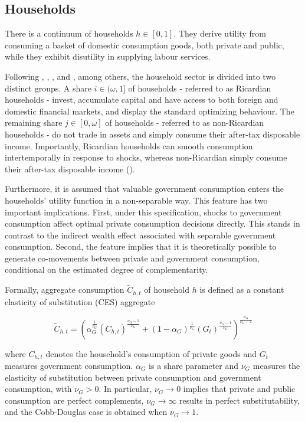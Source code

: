 \documentclass[a4paper,11pt]{article}
\numberwithin{equation}{section}
\begin{document}
	\subsection{Households}
	
	There is a continuum of households $h\in [ 0, 1 ]$. They derive utility from consuming a basket of domestic consumption goods, both private and public, while they exhibit disutility in supplying labour services.
	
	Following \cite{coenen2005}, \cite{gali}, \cite{jooste}, and \cite{coenen2013}, among others, the household sector is divided into two distinct groups. A share $i\in(\omega,1]$ of households - referred to as Ricardian households - invest, accumulate capital and have access to both foreign and domestic financial markets, and display the standard optimizing behaviour. The remaining share $j\in[0,\omega]$ of households - referred to as non-Ricardian households - do not trade in assets and simply consume their after-tax disposable income. Importantly, Ricardian households can smooth consumption intertemporally in response to shocks, whereas non-Ricardian simply consume their after-tax disposable income (\citealp{coenen2013}).
	
	Furthermore, it is assumed that valuable government consumption enters the households' utility function in a non-separable way. This feature has two important implications. First, under this specification, shocks to government consumption affect optimal private consumption decisions directly. This stands in contrast to the indirect wealth effect associated with separable government consumption. Second, the feature implies that it is theoretically possible to generate co-movements between private and government consumption, conditional on the estimated degree of complementarity.
	
	Formally, aggregate consumption $\tilde{C}_{h,t}$ of household $h$ is defined as a constant elasticity of substitution (CES) aggregate
	
	\begin{equation} \label{cons}
	\tilde{C}_{h,t}=\left(\alpha_G^{\frac{1}{\nu_G}}\left(C_{h,t}\right)^{\frac{\nu_G-1}{\nu_G}}+\left(1-\alpha_G\right)^{\frac{1}{\nu_G}}\left(G_t\right)^{\frac{\nu_G-1}{\nu_G}}\right)^{\frac{\nu_G}{\nu_G-1}}
	\end{equation} 
	
	where $C_{h,t}$ denotes the household's consumption of private goods and $G_t$ measures government consumption. $\alpha_G$ is a share parameter and $\nu_G$ measures the elasticity of substitution between private consumption and government consumption, with $\nu_G>0$. In particular, $\nu_G\rightarrow0$ implies that private and public consumption are perfect complements, $\nu_G\rightarrow\infty$ results in perfect substitutability, and the Cobb-Douglas case is obtained when $\nu_G\rightarrow1$.
	
\end{document}
